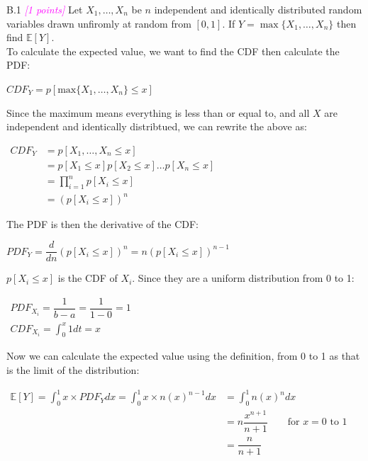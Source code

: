 \documentclass{article}
\newcommand{\1}{\mathbf{1}}
\newcommand{\E}{\mathbb{E}}
\newcommand{\points}[1]{\small\textcolor{magenta}{\emph{[#1 points]}} \normalsize}
\begin{document}
B.1  \points{1} Let $X_1,\dots,X_n$ be $n$ independent and identically distributed random variables drawn unfiromly at random from $[0,1]$. If $Y = \max\{X_1,\dots,X_n\}$ then find $\E[Y]$.\\

To calculate the expected value, we want to find the CDF then calculate the PDF:
\begin{center}
	$CDF_Y=p[\text{max}\{X_1,\dots,X_n\}\leq x]$
\end{center}
Since the maximum means everything is less than or equal to, and all $X$ are independent and identically distribtued, we can rewrite the above as:
\begin{center}
		$\begin{aligned}
	CDF_Y&=p[X_1,\dots,X_n \leq x]\\
	&=p[X_1\leq x]p[X_2\leq x]\dots p[X_n\leq x]\\
	&=\prod_{i=1}^{n}p[X_i\leq x]\\
	&=(p[X_i\leq x])^n
	\end{aligned}$
\end{center}
The PDF is then the derivative of the CDF:
\begin{center}
	$PDF_Y=\dfrac{d}{dn}(p[X_i\leq x])^n=n(p[X_i\leq x])^{n-1}$
\end{center}

$p[X_i\leq x]$ is the CDF of $X_i$. Since they are a uniform distribution from 0 to 1:
\begin{center}
	$\begin{aligned} PDF_{X_i}=\dfrac{1}{b-a}=\dfrac{1}{1-0}=1\\
	CDF_{X_i}=\int_{0}^{x}1dt=x \end{aligned}$
\end{center}
Now we can calculate the expected value using the definition, from 0 to 1 as that is the limit of the distribution:
\begin{center}
	$\begin{aligned} 
	\E[Y]=\int_{0}^{1}x\times PDF_Ydx=\int_{0}^{1}x\times n(x)^{n-1}dx&=\int_{0}^{1}n(x)^ndx\\
	&=n\dfrac{x^{n+1}}{n+1} \qquad \text{for } x=0 \text{ to } 1\\
	&=\dfrac{n}{n+1}
	\end{aligned}$
\end{center}
\end{document}
